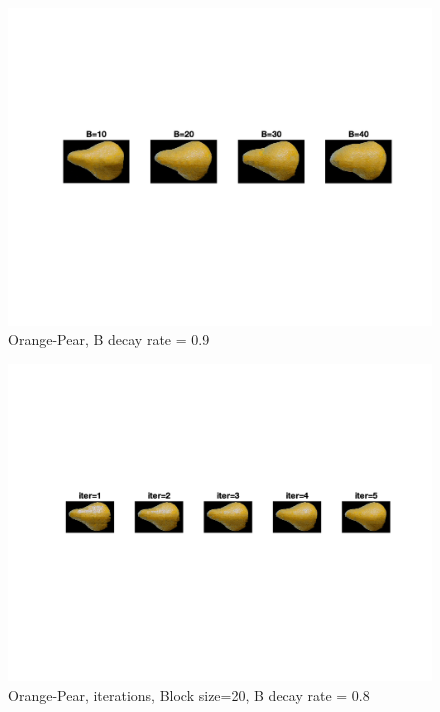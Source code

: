 \documentclass[10pt,twocolumn,letterpaper]{article}
\begin{document}
\begin{figure}[h]
    \begin{center}
    \includegraphics[trim={2cm 6cm 2cm 4cm}, clip, scale=0.9]{../results/bsize/res_orange_pear_bdr_0_900000_iter_5.png}
    \end{center}
    \vspace{-0.2em}
    \caption{Orange-Pear, B decay rate = 0.9}
    \label{fig:orange_pear_bs}
\end{figure}

\begin{figure}[h]
    \begin{center}
    \includegraphics[trim={2cm 6cm 2cm 4cm}, clip, scale=0.9]{../results/iters/res_orange_pear_b_20_bdr_0_800000.png}
    \end{center}
    \vspace{-0.2em}
    \caption{Orange-Pear, iterations, Block size=20, B decay rate = 0.8}
    \label{fig:or_pear_iter}
\end{figure}
\end{document}
